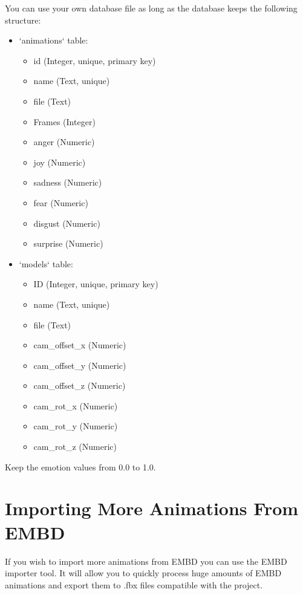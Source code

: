 \noindent You can use your own database file as long as the database keeps the following structure:
\begin{itemize}
	\item `animations` table:
	
	\begin{itemize}
		\item id (Integer, unique, primary key)
		\item name (Text, unique)
		\item file (Text)
		\item Frames (Integer)
		\item anger (Numeric)
		\item joy (Numeric)
		\item sadness (Numeric)
		\item fear (Numeric)
		\item disgust (Numeric)
		\item surprise (Numeric)
	\end{itemize}

	\item `models` table:
	
	\begin{itemize}
		\item ID (Integer, unique, primary key)
		\item name (Text, unique)
		\item file (Text)
		\item cam\_offset\_x (Numeric)
		\item cam\_offset\_y (Numeric)
		\item cam\_offset\_z (Numeric)
		\item cam\_rot\_x (Numeric)
		\item cam\_rot\_y (Numeric)
		\item cam\_rot\_z (Numeric)
	\end{itemize}
\end{itemize}

\noindent Keep the emotion values from 0.0 to 1.0.


\section{Importing More Animations From EMBD}
If you wish to import more animations from EMBD you can use the EMBD importer tool. It will allow you to quickly process huge amounts of EMBD animations and export them to .fbx files compatible with the project.

